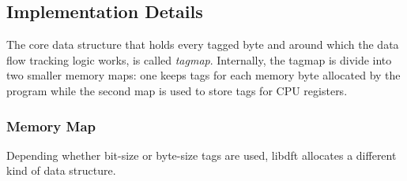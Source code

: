 \documentclass[LaM,binding=0.6cm]{sapthesis}
\begin{document}
\subsection{Implementation Details}
The core data structure that holds every tagged byte and around which the data flow tracking logic works, is called \textit{tagmap}. Internally, the tagmap is divide into two smaller memory maps: one keeps tags for each memory byte allocated by the program while the second map is used to store tags for CPU registers.

\subsubsection{Memory Map}
\label{subsubsec:memorymap}
Depending whether bit-size or byte-size tags are used, libdft allocates a different kind of data structure.
\end{document}
